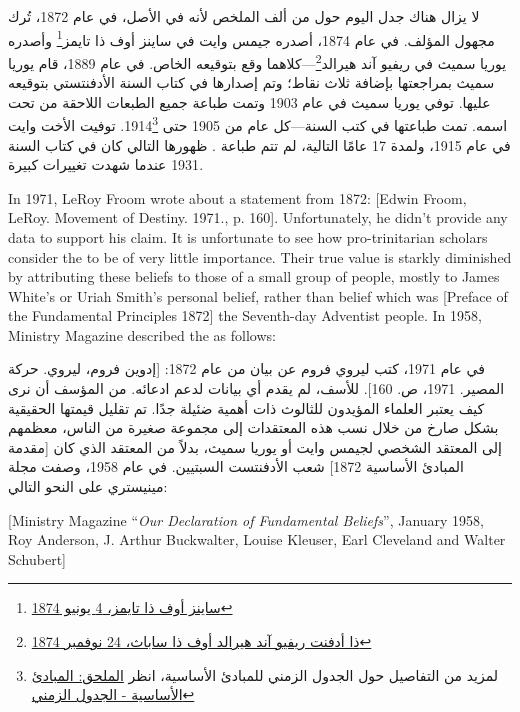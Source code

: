 لا يزال هناك جدل اليوم حول من ألف الملخص لأنه في الأصل، في عام 1872، تُرك مجهول المؤلف. في عام 1874، أصدره جيمس وايت في ساينز أوف ذا تايمز\footnote{\href{https://adventistdigitallibrary.org/adl-364148/signs-times-june-4-1874}{ساينز أوف ذا تايمز، 4 يونيو 1874}} وأصدره يوريا سميث في ريفيو آند هيرالد\footnote{\href{http://documents.adventistarchives.org/Periodicals/RH/RH18741124-V44-22.pdf}{ذا أدفنت ريفيو آند هيرالد أوف ذا ساباث، 24 نوفمبر 1874}}—كلاهما وقع بتوقيعه الخاص. في عام 1889، قام يوريا سميث بمراجعتها بإضافة ثلاث نقاط؛ وتم إصدارها في كتاب السنة الأدفنتستي بتوقيعه عليها. توفي يوريا سميث في عام 1903 وتمت طباعة جميع الطبعات اللاحقة من  تحت اسمه. تمت طباعتها في كتب السنة—كل عام من 1905 حتى 1914\footnote{لمزيد من التفاصيل حول الجدول الزمني للمبادئ الأساسية، انظر \hyperref[appendix:timeline]{الملحق: المبادئ الأساسية - الجدول الزمني}}. توفيت الأخت وايت في عام 1915، ولمدة 17 عامًا التالية، لم تتم طباعة . ظهورها التالي كان في كتاب السنة 1931 عندما شهدت تغييرات كبيرة.


In 1971, LeRoy Froom wrote about a statement from 1872: [Edwin Froom, LeRoy. Movement of Destiny. 1971., p. 160]. Unfortunately, he didn’t provide any data to support his claim. It is unfortunate to see how pro-trinitarian scholars consider the  to be of very little importance. Their true value is starkly diminished by attributing these beliefs to those of a small group of people, mostly to James White’s or Uriah Smith’s personal belief, rather than belief which was [Preface of the Fundamental Principles 1872] the Seventh-day Adventist people. In 1958, Ministry Magazine described the  as follows:


في عام 1971، كتب ليروي فروم عن بيان من عام 1872: [إدوين فروم، ليروي. حركة المصير. 1971، ص. 160]. للأسف، لم يقدم أي بيانات لدعم ادعائه. من المؤسف أن نرى كيف يعتبر العلماء المؤيدون للثالوث  ذات أهمية ضئيلة جدًا. تم تقليل قيمتها الحقيقية بشكل صارخ من خلال نسب هذه المعتقدات إلى مجموعة صغيرة من الناس، معظمهم إلى المعتقد الشخصي لجيمس وايت أو يوريا سميث، بدلاً من المعتقد الذي كان [مقدمة المبادئ الأساسية 1872] شعب الأدفنتست السبتيين. في عام 1958، وصفت مجلة مينيستري  على النحو التالي:


[Ministry Magazine “\textit{Our Declaration of Fundamental Beliefs}”, January 1958, Roy Anderson, J. Arthur Buckwalter, Louise Kleuser, Earl Cleveland and Walter Schubert]


